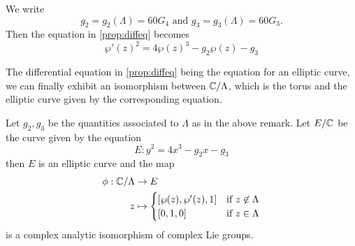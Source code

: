\begin{remark}
	We write
	\begin{equation*}
		g_2 = g_2(\Lambda) = 60G_4
		\textrm{ and }
		g_3 = g_3(\Lambda) = 60G_3.
	\end{equation*}
	Then the equation in \ref{prop:diffeq} becomes
	\begin{equation*}
		\wp'(z)^2 = 4\wp(z)^3 - g_2\wp(z) - g_3
	\end{equation*}
\end{remark}

The differential equation in \ref{prop:diffeq} being the equation for
an elliptic curve, we can finally exhibit an isomorphism between
$\mathbb{C}/\Lambda$, which is the torus and the elliptic curve given by the
corresponding equation.

\begin{theorem}
	\label{thm:lattice-curve}
	Let $g_2, g_3$ be the quantities associated to $\Lambda$ as in the above
	remark.
	Let $E/\mathbb{C}$ be the curve given by the equation
	\begin{equation*}
		E: y^2 = 4x^3 - g_2 x - g_3
	\end{equation*}
	then $E$ is an elliptic curve and the map
	\begin{align*}
		\phi: \mathbb{C}/\Lambda &\to E\\
		z &\mapsto 
		\begin{cases}
			[\wp(z), \wp'(z), 1] &\textrm{if } z \not\in \Lambda\\
			[0, 1, 0] &\textrm{if } z \in \Lambda
		\end{cases}
	\end{align*}
	is a complex analytic isomorphism of complex Lie groups.
\end{theorem}


